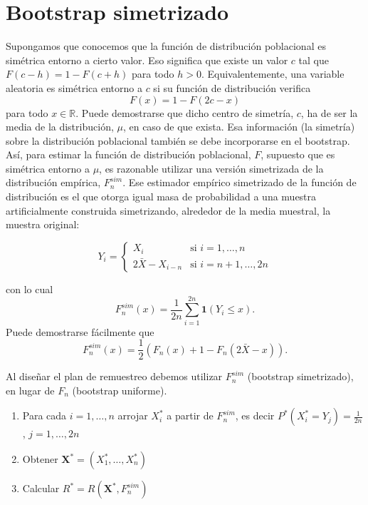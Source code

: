 \documentclass[]{book}
\theoremstyle{definition}
\theoremstyle{definition}
\theoremstyle{definition}
\theoremstyle{remark}
\begin{document}
\section{Bootstrap simetrizado}\label{bootstrap-simetrizado}

Supongamos que conocemos que la función de distribución poblacional es
simétrica entorno a cierto valor. Eso significa que existe un valor
\(c\) tal que \(F\left( c-h \right) =1-F\left( c+h \right)\) para todo
\(h>0\). Equivalentemente, una variable aleatoria es simétrica entorno a
\(c\) si su función de distribución verifica
\[F\left( x \right) = 1 - F\left( 2c - x \right)\] para todo
\(x\in \mathbb{R}\). Puede demostrarse que dicho centro de simetría,
\(c\), ha de ser la media de la distribución, \(\mu\), en caso de que
exista. Esa información (la simetría) sobre la distribución poblacional
también se debe incorporarse en el bootstrap. Así, para estimar la
función de distribución poblacional, \(F\), supuesto que es simétrica
entorno a \(\mu\), es razonable utilizar una versión simetrizada de la
distribución empírica, \(F_n^{sim}\). Ese estimador empírico simetrizado
de la función de distribución es el que otorga igual masa de
probabilidad a una muestra artificialmente construida simetrizando,
alrededor de la media muestral, la muestra original:

\[Y_i=\left\{ 
\begin{array}{ll}
X_i & \text{si } i=1,\ldots ,n \\ 
2\bar{X}-X_{i-n} &\text{si } i=n+1,\ldots ,2n
\end{array}
\right.\]

con lo cual
\[F_n^{sim}\left( x \right) =\frac{1}{2n}\sum_{i=1}^{2n}\mathbf{1}\left( Y_i\leq x \right).\]
Puede demostrarse fácilmente que
\[F_n^{sim}\left( x \right) =\frac{1}{2}\left( F_n\left( x \right)
+1-F_n\left( 2\bar{X}-x \right) \right).\]

Al diseñar el plan de remuestreo debemos utilizar \(F_n^{sim}\)
(bootstrap simetrizado), en lugar de \(F_n\) (bootstrap uniforme).

\begin{enumerate}
\def\labelenumi{\arabic{enumi}.}
\item
  Para cada \(i=1,\ldots ,n\) arrojar \(X_i^{\ast}\) a partir de
  \(F_n^{sim}\), es decir
  \(P^{\ast}\left( X_i^{\ast}=Y_j \right) =\frac{1 }{2n}\),
  \(j=1,\ldots ,2n\)
\item
  Obtener
  \(\mathbf{X}^{\ast}=\left( X_1^{\ast},\ldots ,X_n^{\ast} \right)\)
\item
  Calcular \(R^{\ast}=R\left( \mathbf{X}^{\ast},F_n^{sim} \right)\)
\end{enumerate}
\end{document}

